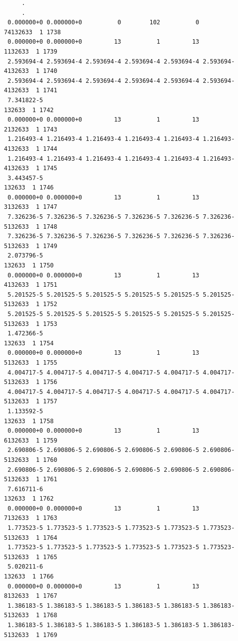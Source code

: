 \begin{verbatim}
     .
     .
 0.000000+0 0.000000+0          0        102          0         74132633  1 1738
 0.000000+0 0.000000+0         13          1         13          1132633  1 1739
 2.593694-4 2.593694-4 2.593694-4 2.593694-4 2.593694-4 2.593694-4132633  1 1740
 2.593694-4 2.593694-4 2.593694-4 2.593694-4 2.593694-4 2.593694-4132633  1 1741
 7.341822-5                                                       132633  1 1742
 0.000000+0 0.000000+0         13          1         13          2132633  1 1743
 1.216493-4 1.216493-4 1.216493-4 1.216493-4 1.216493-4 1.216493-4132633  1 1744
 1.216493-4 1.216493-4 1.216493-4 1.216493-4 1.216493-4 1.216493-4132633  1 1745
 3.443457-5                                                       132633  1 1746
 0.000000+0 0.000000+0         13          1         13          3132633  1 1747
 7.326236-5 7.326236-5 7.326236-5 7.326236-5 7.326236-5 7.326236-5132633  1 1748
 7.326236-5 7.326236-5 7.326236-5 7.326236-5 7.326236-5 7.326236-5132633  1 1749
 2.073796-5                                                       132633  1 1750
 0.000000+0 0.000000+0         13          1         13          4132633  1 1751
 5.201525-5 5.201525-5 5.201525-5 5.201525-5 5.201525-5 5.201525-5132633  1 1752
 5.201525-5 5.201525-5 5.201525-5 5.201525-5 5.201525-5 5.201525-5132633  1 1753
 1.472366-5                                                       132633  1 1754
 0.000000+0 0.000000+0         13          1         13          5132633  1 1755
 4.004717-5 4.004717-5 4.004717-5 4.004717-5 4.004717-5 4.004717-5132633  1 1756
 4.004717-5 4.004717-5 4.004717-5 4.004717-5 4.004717-5 4.004717-5132633  1 1757
 1.133592-5                                                       132633  1 1758
 0.000000+0 0.000000+0         13          1         13          6132633  1 1759
 2.690806-5 2.690806-5 2.690806-5 2.690806-5 2.690806-5 2.690806-5132633  1 1760
 2.690806-5 2.690806-5 2.690806-5 2.690806-5 2.690806-5 2.690806-5132633  1 1761
 7.616711-6                                                       132633  1 1762
 0.000000+0 0.000000+0         13          1         13          7132633  1 1763
 1.773523-5 1.773523-5 1.773523-5 1.773523-5 1.773523-5 1.773523-5132633  1 1764
 1.773523-5 1.773523-5 1.773523-5 1.773523-5 1.773523-5 1.773523-5132633  1 1765
 5.020211-6                                                       132633  1 1766
 0.000000+0 0.000000+0         13          1         13          8132633  1 1767
 1.386183-5 1.386183-5 1.386183-5 1.386183-5 1.386183-5 1.386183-5132633  1 1768
 1.386183-5 1.386183-5 1.386183-5 1.386183-5 1.386183-5 1.386183-5132633  1 1769

\end{verbatim}
